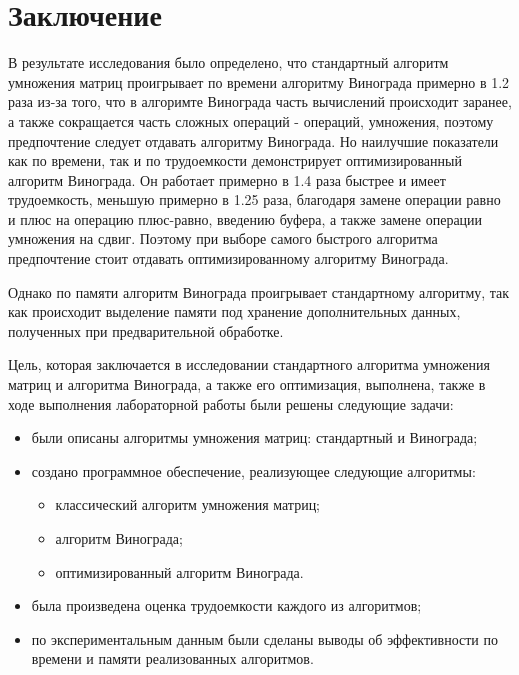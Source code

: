 \chapter*{Заключение}

В результате исследования было определено, 
что стандартный алгоритм умножения матриц проигрывает по времени алгоритму Винограда
примерно в 1.2 раза из-за того, что в алгоримте Винограда часть вычислений происходит
заранее, а также сокращается часть сложных операций -
операций, умножения, поэтому предпочтение следует отдавать алгоритму Винограда. Но 
наилучшие показатели как по времени, так и по трудоемкости демонстрирует оптимизированный алгоритм
Винограда. Он работает примерно 
в 1.4 раза быстрее и имеет трудоемкость, меньшую примерно в 1.25 раза, благодаря замене операции равно и плюс 
на операцию плюс-равно, введению буфера, а также замене операции умножения на сдвиг. Поэтому при выборе
самого быстрого алгоритма предпочтение стоит отдавать оптимизированному алгоритму Винограда.

Однако по памяти алгоритм Винограда проигрывает стандартному алгоритму, так как 
происходит выделение памяти под хранение дополнительных данных, полученных при предварительной обработке.

Цель, которая заключается в исследовании стандартного алгоритма умножения матриц и 
алгоритма Винограда, а также его оптимизация, выполнена, также в ходе выполнения лабораторной 
работы были решены следующие задачи:
\begin{itemize}[left=\parindent]
    \item были описаны алгоритмы умножения матриц: стандартный и Винограда;
    \item создано программное обеспечение, реализующее следующие алгоритмы:
	\begin{itemize}[label=---]
		\item классический алгоритм умножения матриц;
		\item алгоритм Винограда;
		\item оптимизированный алгоритм Винограда.
	\end{itemize}
    \item была произведена оценка трудоемкости каждого из алгоритмов;
    \item по экспериментальным данным были сделаны выводы об эффективности по 
    времени и памяти реализованных алгоритмов.
\end{itemize}
